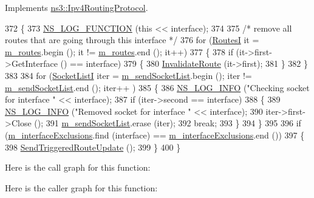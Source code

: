 Implements \hyperlink{classns3_1_1Ipv4RoutingProtocol_a90f728b73ccb1806e5a4093ff156f607}{ns3\+::\+Ipv4\+Routing\+Protocol}.


\begin{DoxyCode}
372 \{
373   \hyperlink{log-macros-disabled_8h_a90b90d5bad1f39cb1b64923ea94c0761}{NS\_LOG\_FUNCTION} (\textcolor{keyword}{this} << interface);
374 
375   \textcolor{comment}{/* remove all routes that are going through this interface */}
376   \textcolor{keywordflow}{for} (\hyperlink{classns3_1_1Rip_a8819af4dd44f270b6b19be755b39bce8}{RoutesI} it = \hyperlink{classns3_1_1Rip_aea6c918ae311cd88fb2bfb714d6f9c30}{m\_routes}.begin (); it != \hyperlink{classns3_1_1Rip_aea6c918ae311cd88fb2bfb714d6f9c30}{m\_routes}.end (); it++)
377     \{
378       \textcolor{keywordflow}{if} (it->first->GetInterface () == interface)
379         \{
380           \hyperlink{classns3_1_1Rip_a48b295877e349360bf978c250ae59083}{InvalidateRoute} (it->first);
381         \}
382     \}
383 
384   \textcolor{keywordflow}{for} (\hyperlink{classns3_1_1Rip_a0395b3977eeeb90190ccfa5758a3957f}{SocketListI} iter = \hyperlink{classns3_1_1Rip_a58b5f6ebcee2ed04249fd025abfa61cb}{m\_sendSocketList}.begin (); iter != 
      \hyperlink{classns3_1_1Rip_a58b5f6ebcee2ed04249fd025abfa61cb}{m\_sendSocketList}.end (); iter++ )
385     \{
386       \hyperlink{group__logging_gafbd73ee2cf9f26b319f49086d8e860fb}{NS\_LOG\_INFO} (\textcolor{stringliteral}{"Checking socket for interface "} << interface);
387       \textcolor{keywordflow}{if} (iter->second == interface)
388         \{
389           \hyperlink{group__logging_gafbd73ee2cf9f26b319f49086d8e860fb}{NS\_LOG\_INFO} (\textcolor{stringliteral}{"Removed socket for interface "} << interface);
390           iter->first->Close ();
391           \hyperlink{classns3_1_1Rip_a58b5f6ebcee2ed04249fd025abfa61cb}{m\_sendSocketList}.erase (iter);
392           \textcolor{keywordflow}{break};
393         \}
394     \}
395 
396   \textcolor{keywordflow}{if} (\hyperlink{classns3_1_1Rip_a30e2c00645f24a3b29be981f5d592773}{m\_interfaceExclusions}.find (interface) == 
      \hyperlink{classns3_1_1Rip_a30e2c00645f24a3b29be981f5d592773}{m\_interfaceExclusions}.end ())
397     \{
398       \hyperlink{classns3_1_1Rip_aee5d3efe6b4dbcd128018f49b981fd7c}{SendTriggeredRouteUpdate} ();
399     \}
400 \}
\end{DoxyCode}


Here is the call graph for this function\+:




Here is the caller graph for this function\+:


